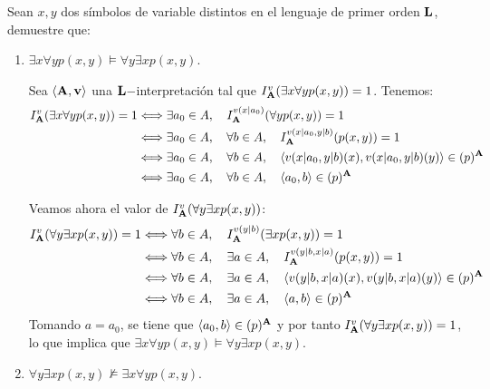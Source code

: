 \begin{ejercicio}
    Sean $x,y$ dos símbolos de variable distintos en el lenguaje de primer orden $\bf{L}$, demuestre que:
    \begin{enumerate}
        \item $\exists x\forall y p(x,y)\vDash \forall y\exists x p(x,y)$.
        
        Sea $\langle \bf{A},v\rangle$ una $\bf{L}-$interpretación tal que $I_{\bf{A}}^v(\exists x\forall y p(x,y))=1$. Tenemos:
        \begin{align*}
            I_{\bf{A}}^v(\exists x\forall y p(x,y)) = 1
            & \Longleftrightarrow \exists a_0\in A,\quad  I_{\bf{A}}^{v(x|a_0)}(\forall y p(x,y))=1\\
            & \Longleftrightarrow \exists a_0\in A,\quad  \forall b\in A,\quad I_{\bf{A}}^{v(x|a_0,y|b)}(p(x,y))=1 \\
            & \Longleftrightarrow \exists a_0\in A,\quad  \forall b\in A,\quad \langle v(x|a_0,y|b)(x),v(x|a_0,y|b)(y)\rangle\in (p)^{\bf{A}}\\
            & \Longleftrightarrow \exists a_0\in A,\quad  \forall b\in A,\quad \langle a_0,b\rangle\in (p)^{\bf{A}}
        \end{align*}

        Veamos ahora el valor de $I_{\bf{A}}^v(\forall y\exists x p(x,y))$:
        \begin{align*}
            I_{\bf{A}}^v(\forall y\exists x p(x,y)) = 1
            & \Longleftrightarrow \forall b\in A,\quad  I_{\bf{A}}^{v(y|b)}(\exists x p(x,y))=1\\
            & \Longleftrightarrow \forall b\in A,\quad  \exists a\in A,\quad I_{\bf{A}}^{v(y|b,x|a)}(p(x,y))=1\\
            & \Longleftrightarrow \forall b\in A,\quad  \exists a\in A,\quad \langle v(y|b,x|a)(x),v(y|b,x|a)(y)\rangle\in (p)^{\bf{A}}\\
            & \Longleftrightarrow \forall b\in A,\quad  \exists a\in A,\quad \langle a,b\rangle\in (p)^{\bf{A}}
        \end{align*}
        Tomando $a=a_0$, se tiene que $\langle a_0,b\rangle\in (p)^{\bf{A}}$ y por tanto $I_{\bf{A}}^v(\forall y\exists x p(x,y))=1$,
        lo que implica que $\exists x\forall y p(x,y)\vDash \forall y\exists x p(x,y)$.

        \item $\forall y\exists x p(x,y)\nvDash \exists x\forall y p(x,y)$.
        

\end{enumerate}
\end{ejercicio}
